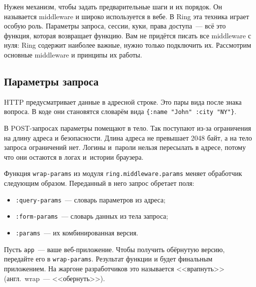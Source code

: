 Нужен механизм, чтобы задать предварительные шаги и их порядок. Он называется
middleware и широко используется в вебе. В Ring эта техника играет особую
роль. Параметры запроса, сессии, куки, права доступа~--- всё это функция,
которая возвращает функцию. Вам не придётся писать все middleware с нуля: Ring
содержит наиболее важные, нужно только подключить их. Рассмотрим основные
middleware и принципы их работы.

\subsection{Параметры запроса}

\label{ring-params}


HTTP предусматривает данные в адресной строке. Это пары вида
 после знака вопроса. В коде они становятся
словарём вида \verb|{:name "John" :city "NY"}|.

В POST-запросах параметры помещают в тело. Так поступают из-за ограничения на
длину адреса и безопасности. Длина адреса не превышает 2048 байт, а на тело
запроса ограничений нет. Логины и~пароли нельзя пересылать в адресе, потому что
они остаются в логах и~истории браузера.


Функция \verb|wrap-params| из модуля \texttt{ring.middle\-ware.params} меняет
обработчик следующим образом. Переданный в него запрос обретает поля:

\begin{itemize}

\item
  \verb|:query-params|~--- словарь параметров из адреса;

\item
  \verb|:form-params|~--- словарь данных из тела запроса;

\item
  \verb|:params|~--- их комбинированная версия.

\end{itemize}

Пусть \verb|app|~--- ваше веб-приложение. Чтобы получить обёрнутую версию,
передайте его в \verb|wrap-params|. Результат функции и будет финальным
приложением. На жаргоне разработчиков это называется <<врапнуть>>
(англ.~wrap~--- <<обернуть>>).


